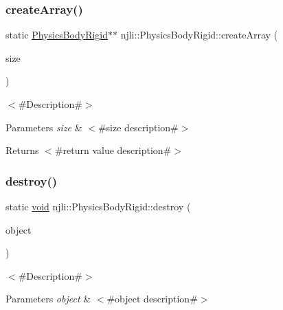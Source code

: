 \subsubsection{\texorpdfstring{create\+Array()}{createArray()}}
{\footnotesize\ttfamily static \mbox{\hyperlink{classnjli_1_1_physics_body_rigid}{Physics\+Body\+Rigid}}$\ast$$\ast$ njli\+::\+Physics\+Body\+Rigid\+::create\+Array (\begin{DoxyParamCaption}\item[{const \mbox{\hyperlink{_util_8h_a10e94b422ef0c20dcdec20d31a1f5049}{u32}}}]{size }\end{DoxyParamCaption})\hspace{0.3cm}{\ttfamily [static]}}

$<$\#\+Description\#$>$


\begin{DoxyParams}{Parameters}
{\em size} & $<$\#size description\#$>$\\
\hline
\end{DoxyParams}
\begin{DoxyReturn}{Returns}
$<$\#return value description\#$>$ 
\end{DoxyReturn}
\mbox{\label{classnjli_1_1_physics_body_rigid_a537eeedf7da62318ae0d3a2d076b5fd4}} 
\subsubsection{\texorpdfstring{destroy()}{destroy()}}
{\footnotesize\ttfamily static \mbox{\hyperlink{_thread_8h_af1e856da2e658414cb2456cb6f7ebc66}{void}} njli\+::\+Physics\+Body\+Rigid\+::destroy (\begin{DoxyParamCaption}\item[{\mbox{\hyperlink{classnjli_1_1_physics_body_rigid}{Physics\+Body\+Rigid}} $\ast$}]{object }\end{DoxyParamCaption})\hspace{0.3cm}{\ttfamily [static]}}

$<$\#\+Description\#$>$


\begin{DoxyParams}{Parameters}
{\em object} & $<$\#object description\#$>$ \\
\hline
\end{DoxyParams}
\mbox{\label{classnjli_1_1_physics_body_rigid_aa7454c3658a28f869dbcc5d6c0386673}} 
